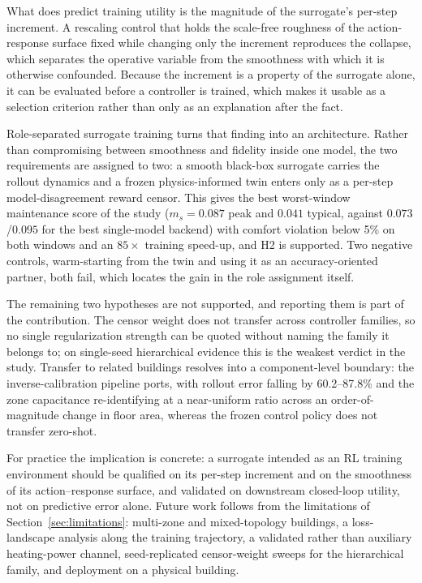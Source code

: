 \documentclass[energies,article,submit,moreauthors]{Definitions/mdpi}
\newcommand{\ms}{\ensuremath{m_s}}
\begin{document}
What does predict training utility is the magnitude of the surrogate's per-step increment. A
rescaling control that holds the scale-free roughness of the action-response surface fixed while
changing only the increment reproduces the collapse, which separates the operative variable from the
smoothness with which it is otherwise confounded. Because the increment is a property of the
surrogate alone, it can be evaluated before a controller is trained, which makes it usable as a
selection criterion rather than only as an explanation after the fact.

Role-separated surrogate training turns that finding into an architecture. Rather than compromising
between smoothness and fidelity inside one model, the two requirements are assigned to two: a smooth
black-box surrogate carries the rollout dynamics and a frozen physics-informed twin enters only as a
per-step model-disagreement reward censor. This gives the best worst-window maintenance score of the
study ($\ms=0.087$ peak and $0.041$ typical, against $0.073$/$0.095$ for the best single-model
backend) with comfort violation below 5\% on both windows and an $85\times$ training speed-up, and
H2 is supported. Two negative controls, warm-starting from the twin and using it as an
accuracy-oriented partner, both fail, which locates the gain in the role assignment itself.

The remaining two hypotheses are not supported, and reporting them is part of the contribution. The
censor weight does not transfer across controller families, so no single regularization strength can
be quoted without naming the family it belongs to; on single-seed hierarchical evidence this is the
weakest verdict in the study. Transfer to related buildings resolves into a component-level
boundary: the inverse-calibration pipeline ports, with rollout error falling by 60.2--87.8\% and the
zone capacitance re-identifying at a near-uniform ratio across an order-of-magnitude change in floor
area, whereas the frozen control policy does not transfer zero-shot.

For practice the implication is concrete: a surrogate intended as an RL training environment should
be qualified on its per-step increment and on the smoothness of its action--response surface, and
validated on downstream closed-loop utility, not on predictive error alone. Future work follows from
the limitations of Section~\ref{sec:limitations}: multi-zone and mixed-topology buildings, a
loss-landscape analysis along the training trajectory, a validated rather than auxiliary
heating-power channel, seed-replicated censor-weight sweeps for the hierarchical family, and
deployment on a physical building.
\end{document}
